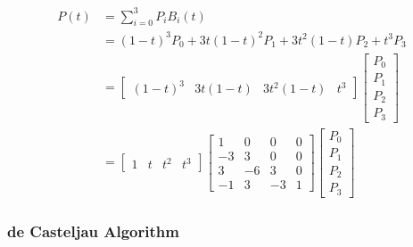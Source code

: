 \documentclass[10pt,landscape]{article}
\begin{document}
\begin{multicols}{3}
\begin{align*}
    P(t) &= \sum_{i=0}^3 P_i B_i(t) \\
    &= (1-t)^3 P_0 + 3t(1-t)^2 P_1 + 3t^2(1-t) P_2 + t^3 P_3 \\
    &=  \begin{bmatrix}
            (1-t)^3 & 3t(1-t) & 3t^2(1-t) & t^3
        \end{bmatrix}
        \begin{bmatrix}
            P_0 \\
            P_1 \\
            P_2 \\
            P_3
        \end{bmatrix} \\
    &=  \begin{bmatrix}
            1 & t & t^2 & t^3
        \end{bmatrix}
        \begin{bmatrix}
            1 & 0 & 0 & 0 \\
            -3 & 3 & 0 & 0 \\
            3 & -6 & 3 & 0 \\
            -1 & 3 & -3 & 1
        \end{bmatrix}
        \begin{bmatrix}
            P_0 \\
            P_1 \\
            P_2 \\
            P_3
        \end{bmatrix}
\end{align*}

\subsubsection{de Casteljau Algorithm}



\end{multicols}
\end{document}
